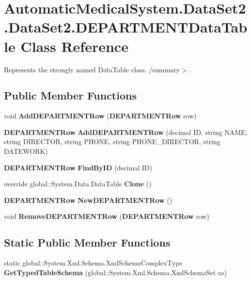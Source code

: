 \section{AutomaticMedicalSystem.DataSet2.DataSet2.DEPARTMENTDataTable Class Reference}
\label{class_automatic_medical_system_1_1_data_set2_1_1_d_e_p_a_r_t_m_e_n_t_data_table}
Represents the strongly named DataTable class. /summary$>$.  


\subsection*{Public Member Functions}
\begin{CompactItemize}
\item 
void \textbf{AddDEPARTMENTRow} ({\bf DEPARTMENTRow} row)\label{class_automatic_medical_system_1_1_data_set2_1_1_d_e_p_a_r_t_m_e_n_t_data_table_7479c393101a556b1318ad13e005f926}

\item 
{\bf DEPARTMENTRow} \textbf{AddDEPARTMENTRow} (decimal ID, string NAME, string DIRECTOR, string PHONE, string PHONE\_\-DIRECTOR, string DATEWORK)\label{class_automatic_medical_system_1_1_data_set2_1_1_d_e_p_a_r_t_m_e_n_t_data_table_1387b11706db64961e222b87c9cdb56c}

\item 
{\bf DEPARTMENTRow} \textbf{FindByID} (decimal ID)\label{class_automatic_medical_system_1_1_data_set2_1_1_d_e_p_a_r_t_m_e_n_t_data_table_4866642b0e09bac1079d9d65db45fa40}

\item 
override global::System.Data.DataTable \textbf{Clone} ()\label{class_automatic_medical_system_1_1_data_set2_1_1_d_e_p_a_r_t_m_e_n_t_data_table_49704fca012d662e9a3370d869bc98c5}

\item 
{\bf DEPARTMENTRow} \textbf{NewDEPARTMENTRow} ()\label{class_automatic_medical_system_1_1_data_set2_1_1_d_e_p_a_r_t_m_e_n_t_data_table_35d7982763dee628fa42420bd8e0a5f7}

\item 
void \textbf{RemoveDEPARTMENTRow} ({\bf DEPARTMENTRow} row)\label{class_automatic_medical_system_1_1_data_set2_1_1_d_e_p_a_r_t_m_e_n_t_data_table_7ae19dcea6c8da2b7cf550021420816a}

\end{CompactItemize}
\subsection*{Static Public Member Functions}
\begin{CompactItemize}
\item 
static global::System.Xml.Schema.XmlSchemaComplexType \textbf{GetTypedTableSchema} (global::System.Xml.Schema.XmlSchemaSet xs)\label{class_automatic_medical_system_1_1_data_set2_1_1_d_e_p_a_r_t_m_e_n_t_data_table_14e8cd43b22e38fa491851973791c84f}

\end{CompactItemize}
